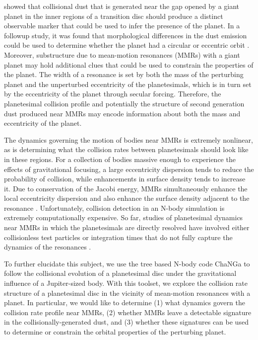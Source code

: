 \cite{dobinson13} showed that collisional dust that is generated near the gap opened by a giant planet in the inner regions of a 
transition disc should produce a distinct observable marker that could be used to infer the presence of the planet. In a followup 
study, it was found that morphological differences in the dust emission could be used to determine whether the planet had a 
circular or eccentric orbit \cite{dobinson16}. Moreover, substructure due to mean-motion resonances (MMRs) with a giant planet 
may hold additional clues that could be used to constrain the properties of the planet.  The width of a resonance is set by both 
the mass of the perturbing planet and the unperturbed eccentricity of the planetesimals, which is in turn set by the eccentricity of 
the planet through secular forcing. Therefore, the planetesimal collision profile and potentially the structure of second generation 
dust produced near MMRs may encode information about both the mass and eccentricity of the planet.

The dynamics governing the motion of bodies near MMRs is extremely nonlinear, as is determining what the collision rates 
between planetesimals should look like in these regions. For a collection of bodies massive enough to experience the effects of 
gravitational focusing, a large eccentricity dispersion tends to reduce the probability of collision, while enhancements in surface 
density tends to increase it. Due to conservation of the Jacobi energy, MMRs simultaneously enhance the local eccentricity 
dispersion and also enhance the surface density adjacent to the resonance \cite{richardson00, boley17}. Unfortunately, collision 
detection in an N-body simulation is extremely computationally expensive. So far, studies of planetesimal dynamics near MMRs 
in which the planetesimals are directly resolved have involved either collisionless test particles 
\cite{boley17, tabeshian16, tabeshian18} or integration times that do not fully capture the dynamics of the resonances 
\cite{richardson00, dobinson13}.

To further elucidate this subject, we use the tree based N-body code {\sc ChaNGa} \cite{jetley08, menon15} to follow the 
collisional evolution of a planetesimal disc under the gravitational influence of a Jupiter-sized body.  With this toolset, we explore the 
collision rate structure of a planetesimal disc in the vicinity of mean-motion resonances with a planet. In particular, we would like to
determine (1) what dynamics govern the collision rate profile near MMRs, (2) whether MMRs leave a detectable signature in the 
collisionally-generated dust, and (3) whether these signatures can be used to determine or constrain the orbital properties of the 
perturbing planet.


